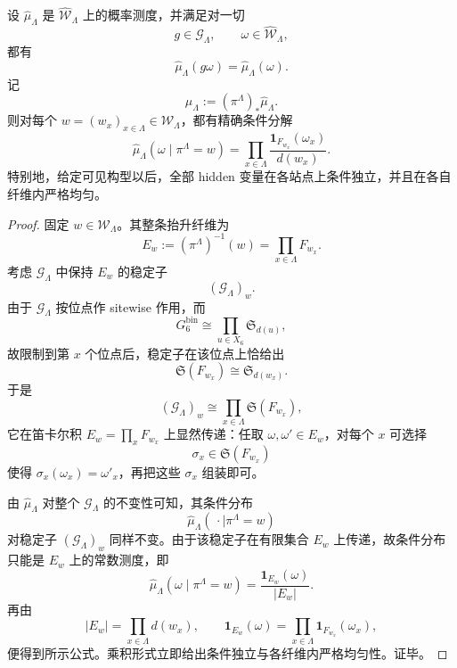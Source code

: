 \begin{theorem}[规范抬升的条件均匀化]\label{thm:xi-time-part9z-window6-canonical-lift-conditional-uniformization}
设 \(\widehat\mu_\Lambda\) 是 \(\widehat{\mathcal W}_\Lambda\) 上的概率测度，并满足对一切
\[
g\in \mathcal G_\Lambda,\qquad \omega\in \widehat{\mathcal W}_\Lambda,
\]
都有
\[
\widehat\mu_\Lambda(g\omega)=\widehat\mu_\Lambda(\omega).
\]
记
\[
\mu_\Lambda:=(\pi^\Lambda)_*\widehat\mu_\Lambda.
\]
则对每个 \(w=(w_x)_{x\in\Lambda}\in \mathcal W_\Lambda\)，都有精确条件分解
\[
\widehat\mu_\Lambda(\omega\mid \pi^\Lambda=w)
=
\prod_{x\in\Lambda}
\frac{\mathbf 1_{F_{w_x}}(\omega_x)}{d(w_x)}.
\]
特别地，给定可见构型以后，全部 hidden 变量在各站点上条件独立，并且在各自纤维内严格均匀。
\end{theorem}
\begin{proof}
固定 \(w\in \mathcal W_\Lambda\)。其整条抬升纤维为
\[
E_w:=(\pi^\Lambda)^{-1}(w)=\prod_{x\in\Lambda}F_{w_x}.
\]
考虑 \(\mathcal G_\Lambda\) 中保持 \(E_w\) 的稳定子
\[
(\mathcal G_\Lambda)_w.
\]
由于 \(\mathcal G_\Lambda\) 按位点作 sitewise 作用，而
\[
G_6^{\mathrm{bin}}\cong \prod_{u\in X_6}\mathfrak S_{d(u)},
\]
故限制到第 \(x\) 个位点后，稳定子在该位点上恰给出
\[
\mathfrak S(F_{w_x})\cong \mathfrak S_{d(w_x)}.
\]
于是
\[
(\mathcal G_\Lambda)_w\cong \prod_{x\in\Lambda}\mathfrak S(F_{w_x}),
\]
它在笛卡尔积 \(E_w=\prod_x F_{w_x}\) 上显然传递：任取 \(\omega,\omega'\in E_w\)，对每个 \(x\) 可选择
\[
\sigma_x\in \mathfrak S(F_{w_x})
\]
使得 \(\sigma_x(\omega_x)=\omega'_x\)，再把这些 \(\sigma_x\) 组装即可。

由 \(\widehat\mu_\Lambda\) 对整个 \(\mathcal G_\Lambda\) 的不变性可知，其条件分布
\[
\widehat\mu_\Lambda(\,\cdot\mid \pi^\Lambda=w)
\]
对稳定子 \((\mathcal G_\Lambda)_w\) 同样不变。由于该稳定子在有限集合 \(E_w\) 上传递，故条件分布只能是 \(E_w\) 上的常数测度，即
\[
\widehat\mu_\Lambda(\omega\mid \pi^\Lambda=w)
=
\frac{\mathbf 1_{E_w}(\omega)}{|E_w|}.
\]
再由
\[
|E_w|=\prod_{x\in\Lambda}d(w_x),
\qquad
\mathbf 1_{E_w}(\omega)=\prod_{x\in\Lambda}\mathbf 1_{F_{w_x}}(\omega_x),
\]
便得到所示公式。乘积形式立即给出条件独立与各纤维内严格均匀性。证毕。
\end{proof}

